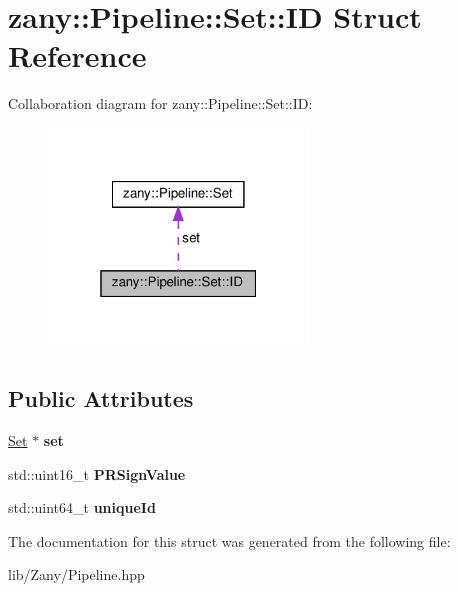 \hypertarget{structzany_1_1_pipeline_1_1_set_1_1_i_d}{}\section{zany\+:\+:Pipeline\+:\+:Set\+:\+:ID Struct Reference}
\label{structzany_1_1_pipeline_1_1_set_1_1_i_d}


Collaboration diagram for zany\+:\+:Pipeline\+:\+:Set\+:\+:ID\+:
\nopagebreak
\begin{figure}[H]
\begin{center}
\leavevmode
\includegraphics[width=196pt]{structzany_1_1_pipeline_1_1_set_1_1_i_d__coll__graph}
\end{center}
\end{figure}
\subsection*{Public Attributes}
\begin{DoxyCompactItemize}
\item 
\mbox{\label{structzany_1_1_pipeline_1_1_set_1_1_i_d_a3b9b99b712782c510a51a8cb65bb4b9c}} 
\hyperlink{classzany_1_1_pipeline_1_1_set}{Set} $\ast$ {\bfseries set}
\item 
\mbox{\label{structzany_1_1_pipeline_1_1_set_1_1_i_d_a30b5988e6ccbf8eaa232609b3f05ddfa}} 
std\+::uint16\+\_\+t {\bfseries P\+R\+Sign\+Value}
\item 
\mbox{\label{structzany_1_1_pipeline_1_1_set_1_1_i_d_a91385da67ab6923f29c02a618945f962}} 
std\+::uint64\+\_\+t {\bfseries unique\+Id}
\end{DoxyCompactItemize}


The documentation for this struct was generated from the following file\+:\begin{DoxyCompactItemize}
\item 
lib/\+Zany/Pipeline.\+hpp\end{DoxyCompactItemize}

